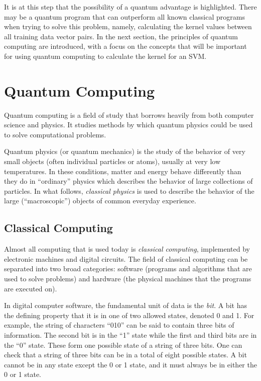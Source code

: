 \documentclass[%
 reprint,
nofootinbib,
 amsmath,amssymb,
 aps,
]{revtex4-2}
\begin{document}
It is at this step that the possibility of a quantum advantage is highlighted. There may be a quantum program that can outperform all known classical programs when trying to solve this problem, namely, calculating the kernel values between all training data vector pairs. In the next section, the principles of quantum computing are introduced, with a focus on the concepts that will be important for using quantum computing to calculate the kernel for an SVM.

\section{Quantum Computing}
\label{sec:QC}

Quantum computing is a field of study that borrows heavily from both computer science and physics. It studies methods by which quantum physics could be used to solve computational problems.

Quantum physics (or quantum mechanics) is the study of the behavior of very small objects (often individual particles or atoms), usually at very low temperatures. In these conditions, matter and energy behave differently than they do in ``ordinary'' physics which describes the behavior of large collections of particles. In what follows, \textit{classical physics} is used to describe the behavior of the large (``macroscopic'') objects of common everyday experience.

\subsection{Classical Computing}

Almost all computing that is used today is \textit{classical computing}, implemented by electronic machines and digital circuits. The field of classical computing can be separated into two broad categories: software (programs and algorithms that are used to solve problems) and hardware (the physical machines that the programs are executed on). 

In digital computer software, the fundamental unit of data is the \textit{bit}. A bit has the defining property that it is in one of two allowed states, denoted 0 and 1. For example, the string of characters ``010'' can be said to contain three bits of information. The second bit is in the ``1'' state while the first and third bits are in the ``0'' state. These form one possible state of a string of three bits. One can check that a string of three bits can be in a total of eight possible states. A bit cannot be in any state except the 0 or 1 state, and it must always be in either the 0 or 1 state.
\end{document}
